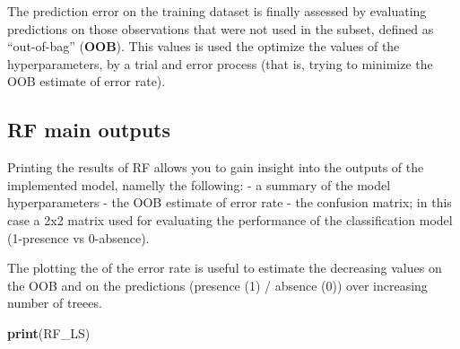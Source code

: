 \documentclass[
]{book}
\newenvironment{Shaded}{\begin{snugshade}}{\end{snugshade}}
\newcommand{\AttributeTok}[1]{\textcolor[rgb]{0.13,0.29,0.53}{#1}}
\newcommand{\CommentTok}[1]{\textcolor[rgb]{0.56,0.35,0.01}{\textit{#1}}}
\newcommand{\ConstantTok}[1]{\textcolor[rgb]{0.56,0.35,0.01}{#1}}
\newcommand{\DecValTok}[1]{\textcolor[rgb]{0.00,0.00,0.81}{#1}}
\newcommand{\DocumentationTok}[1]{\textcolor[rgb]{0.56,0.35,0.01}{\textbf{\textit{#1}}}}
\newcommand{\FunctionTok}[1]{\textcolor[rgb]{0.13,0.29,0.53}{\textbf{#1}}}
\newcommand{\NormalTok}[1]{#1}
\newcommand{\OtherTok}[1]{\textcolor[rgb]{0.56,0.35,0.01}{#1}}
\newcommand{\SpecialCharTok}[1]{\textcolor[rgb]{0.81,0.36,0.00}{\textbf{#1}}}
\begin{document}
The prediction error on the training dataset is finally assessed by evaluating predictions on those observations that were not used in the subset, defined as ``out-of-bag'' (\textbf{OOB}).
This values is used the optimize the values of the hyperparameters, by a trial and error process (that is, trying to minimize the OOB estimate of error rate).

\begin{Shaded}
\end{Shaded}

\hypertarget{rf-main-outputs}{%
\subsection{RF main outputs}\label{rf-main-outputs}}

Printing the results of RF allows you to gain insight into the outputs of the implemented model, namelly the following: - a summary of the model hyperparameters - the OOB estimate of error rate - the confusion matrix; in this case a 2x2 matrix used for evaluating the performance of the classification model (1-presence vs 0-absence).

The plotting the of the error rate is useful to estimate the decreasing values on the OOB and on the predictions (presence (1) / absence (0)) over increasing number of treees.

\begin{Shaded}
\begin{Highlighting}[]
\FunctionTok{print}\NormalTok{(RF\_LS)}
\end{Highlighting}
\end{Shaded}
\end{document}
